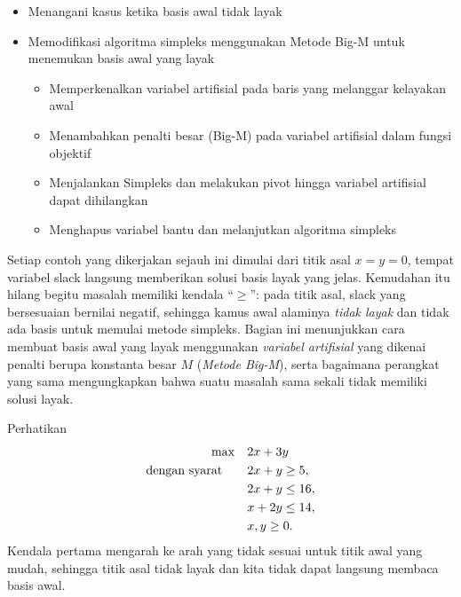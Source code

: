 \begin{outcome}
\begin{itemize}
\item Menangani kasus ketika basis awal tidak layak
\item Memodifikasi algoritma simpleks menggunakan Metode Big-M untuk menemukan basis awal yang layak
\begin{itemize}
\item Memperkenalkan variabel artifisial pada baris yang melanggar kelayakan awal
\item Menambahkan penalti besar (Big-M) pada variabel artifisial dalam fungsi objektif
\item Menjalankan Simpleks dan melakukan pivot hingga variabel artifisial dapat dihilangkan
\item Menghapus variabel bantu dan melanjutkan algoritma simpleks
\end{itemize}
\end{itemize}
\end{outcome}


Setiap contoh yang dikerjakan sejauh ini dimulai dari titik asal $x=y=0$, tempat variabel slack langsung memberikan solusi basis layak yang jelas. Kemudahan itu hilang begitu masalah memiliki kendala ``$\ge$'': pada titik asal, slack yang bersesuaian bernilai negatif, sehingga kamus awal alaminya \emph{tidak layak} dan tidak ada basis untuk memulai metode simpleks. Bagian ini menunjukkan cara membuat basis awal yang layak menggunakan \emph{variabel artifisial} yang dikenai penalti berupa konstanta besar $M$ (\emph{Metode Big-M}), serta bagaimana perangkat yang sama mengungkapkan bahwa suatu masalah sama sekali tidak memiliki solusi layak.

Perhatikan
\[
\begin{aligned}
\max\quad & 2x + 3y \\
\mbox{dengan syarat}\quad\quad & 2x + y \geq 5, \\
& 2x + y \leq 16, \\
& x + 2y \leq 14, \\
& x, y \geq 0.
\end{aligned}
\]
Kendala pertama mengarah ke arah yang tidak sesuai untuk titik awal yang mudah, sehingga titik asal tidak layak dan kita tidak dapat langsung membaca basis awal.

